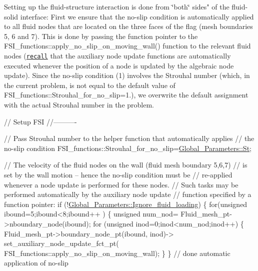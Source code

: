 Setting up the fluid-\/structure interaction is done from \char`\"{}both\char`\"{} sides" of the fluid-\/solid interface\+: First we ensure that the no-\/slip condition is automatically applied to all fluid nodes that are located on the three faces of the flag (mesh boundaries 5, 6 and 7). This is done by passing the function pointer to the {\ttfamily F\+S\+I\+\_\+functions\+::apply\+\_\+no\+\_\+slip\+\_\+on\+\_\+moving\+\_\+wall()} function to the relevant fluid nodes (\href{../../../navier_stokes/osc_ellipse/html/index.html}{\tt recall} that the auxiliary node update functions are automatically executed whenever the position of a node is updated by the algebraic node update). Since the no-\/slip condition (1) involves the Strouhal number (which, in the current problem, is not equal to the default value of {\ttfamily F\+S\+I\+\_\+functions\+::\+Strouhal\+\_\+for\+\_\+no\+\_\+slip=1.}), we overwrite the default assignment with the actual Strouhal number in the problem.


\begin{DoxyCodeInclude}



 \textcolor{comment}{// Setup FSI}
 \textcolor{comment}{//----------}
 
 \textcolor{comment}{// Pass Strouhal number to the helper function that automatically applies}
 \textcolor{comment}{// the no-slip condition}
 FSI\_functions::Strouhal\_for\_no\_slip=\hyperlink{namespaceGlobal__Parameters_af1af40a0df651e86bc1be273fafa98da}{Global\_Parameters::St};

 \textcolor{comment}{// The velocity of the fluid nodes on the wall (fluid mesh boundary 5,6,7)}
 \textcolor{comment}{// is set by the wall motion -- hence the no-slip condition must be}
 \textcolor{comment}{// re-applied whenever a node update is performed for these nodes. }
 \textcolor{comment}{// Such tasks may be performed automatically by the auxiliary node update }
 \textcolor{comment}{// function specified by a function pointer:}
 \textcolor{keywordflow}{if} (!\hyperlink{namespaceGlobal__Parameters_aac13d615d2acd78d22a3137ffd62f7aa}{Global\_Parameters::Ignore\_fluid\_loading})
  \{
   \textcolor{keywordflow}{for}(\textcolor{keywordtype}{unsigned} ibound=5;ibound<8;ibound++ )
    \{ 
     \textcolor{keywordtype}{unsigned} num\_nod= Fluid\_mesh\_pt->nboundary\_node(ibound);
     \textcolor{keywordflow}{for} (\textcolor{keywordtype}{unsigned} inod=0;inod<num\_nod;inod++)
      \{   
       Fluid\_mesh\_pt->boundary\_node\_pt(ibound, inod)->
        set\_auxiliary\_node\_update\_fct\_pt(
         FSI\_functions::apply\_no\_slip\_on\_moving\_wall);
      \}
    \} \textcolor{comment}{// done automatic application of no-slip}

\end{DoxyCodeInclude}


